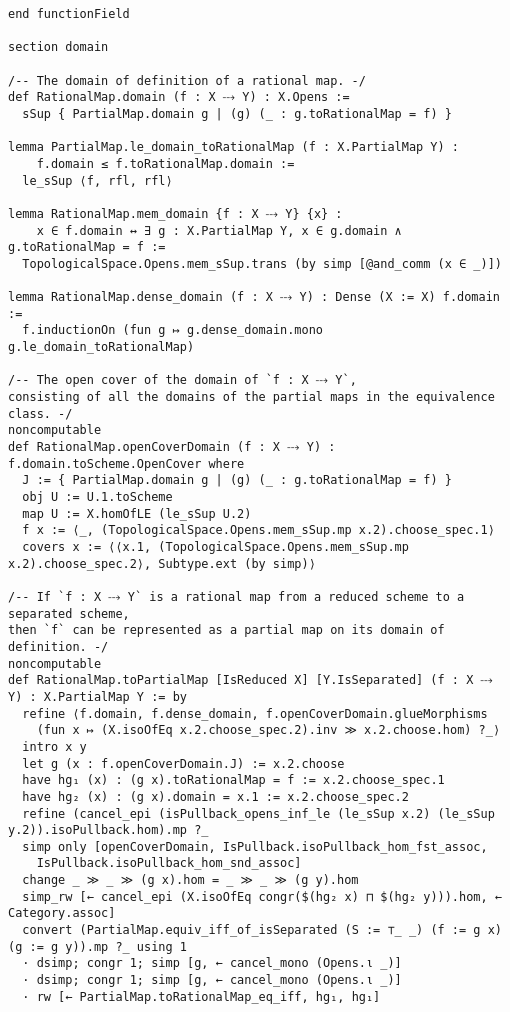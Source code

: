 \documentclass{article}
\begin{document}
\begin{lstlisting}[language=Lean, caption={RationalMap.lean}]
end functionField

section domain

/-- The domain of definition of a rational map. -/
def RationalMap.domain (f : X ⤏ Y) : X.Opens :=
  sSup { PartialMap.domain g | (g) (_ : g.toRationalMap = f) }

lemma PartialMap.le_domain_toRationalMap (f : X.PartialMap Y) :
    f.domain ≤ f.toRationalMap.domain :=
  le_sSup ⟨f, rfl, rfl⟩

lemma RationalMap.mem_domain {f : X ⤏ Y} {x} :
    x ∈ f.domain ↔ ∃ g : X.PartialMap Y, x ∈ g.domain ∧ g.toRationalMap = f :=
  TopologicalSpace.Opens.mem_sSup.trans (by simp [@and_comm (x ∈ _)])

lemma RationalMap.dense_domain (f : X ⤏ Y) : Dense (X := X) f.domain :=
  f.inductionOn (fun g ↦ g.dense_domain.mono g.le_domain_toRationalMap)

/-- The open cover of the domain of `f : X ⤏ Y`,
consisting of all the domains of the partial maps in the equivalence class. -/
noncomputable
def RationalMap.openCoverDomain (f : X ⤏ Y) : f.domain.toScheme.OpenCover where
  J := { PartialMap.domain g | (g) (_ : g.toRationalMap = f) }
  obj U := U.1.toScheme
  map U := X.homOfLE (le_sSup U.2)
  f x := ⟨_, (TopologicalSpace.Opens.mem_sSup.mp x.2).choose_spec.1⟩
  covers x := ⟨⟨x.1, (TopologicalSpace.Opens.mem_sSup.mp x.2).choose_spec.2⟩, Subtype.ext (by simp)⟩

/-- If `f : X ⤏ Y` is a rational map from a reduced scheme to a separated scheme,
then `f` can be represented as a partial map on its domain of definition. -/
noncomputable
def RationalMap.toPartialMap [IsReduced X] [Y.IsSeparated] (f : X ⤏ Y) : X.PartialMap Y := by
  refine ⟨f.domain, f.dense_domain, f.openCoverDomain.glueMorphisms
    (fun x ↦ (X.isoOfEq x.2.choose_spec.2).inv ≫ x.2.choose.hom) ?_⟩
  intro x y
  let g (x : f.openCoverDomain.J) := x.2.choose
  have hg₁ (x) : (g x).toRationalMap = f := x.2.choose_spec.1
  have hg₂ (x) : (g x).domain = x.1 := x.2.choose_spec.2
  refine (cancel_epi (isPullback_opens_inf_le (le_sSup x.2) (le_sSup y.2)).isoPullback.hom).mp ?_
  simp only [openCoverDomain, IsPullback.isoPullback_hom_fst_assoc,
    IsPullback.isoPullback_hom_snd_assoc]
  change _ ≫ _ ≫ (g x).hom = _ ≫ _ ≫ (g y).hom
  simp_rw [← cancel_epi (X.isoOfEq congr($(hg₂ x) ⊓ $(hg₂ y))).hom, ← Category.assoc]
  convert (PartialMap.equiv_iff_of_isSeparated (S := ⊤_ _) (f := g x) (g := g y)).mp ?_ using 1
  · dsimp; congr 1; simp [g, ← cancel_mono (Opens.ι _)]
  · dsimp; congr 1; simp [g, ← cancel_mono (Opens.ι _)]
  · rw [← PartialMap.toRationalMap_eq_iff, hg₁, hg₁]


\end{lstlisting}
\end{document}
